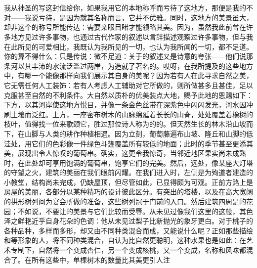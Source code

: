 

\section{}

\par

\par

我从神圣的写这封信给你，如果我用它的本地称呼而亏待了这地方，那便是我的不对——我说亏待，是因为就其名称而言，它并不优雅。同时，这地方的美景虽大，却非这个的称号所能传达：需要亲眼目睹才能领略其美。因为，虽然我此前曾在许多地方见过许多事物，也通过古代作家的叙述以言辞描述观察过许多事物，但与我在此所见的可爱相比，我既认为我所见的一切，也认为我所闻的一切，都不足道。你的算不得什么：只是传说：微不足道：关于的叙述又是诗意的夸张——他们说那条河以其丰沛的水流泛滥过两岸，为造就了著名的。哎呀，在我所提及的这些地方中，有哪一个能像那样向我们展示其自身的美呢？因为若有人在此寻求自然之美，它无需任何人工装饰：若有人考虑人工辅助对它所做的，则所做甚多且甚佳，足以克服甚至自然的不利条件。大自然以质朴的优美装点大地，赐予此地的恩赐如下：下方，以其河岸使这地方悦目，并像一条金色丝带在深紫色中闪闪发光，河水因冲刷土壤而泛红。上方，一座密布树木的山脉绵延着长长的山脊，处处覆盖着橡树的枝叶，值得找一位来歌颂它，胜过那位诗人称为的的。但天然生长的林木沿山坡而下，在山脚与人类的耕作种植相遇。因为立刻，葡萄藤遍布山坡、隆丘和山脚的低洼处，用它们的色彩像一件绿色斗篷覆盖所有较低的地面；此时的季节甚至更添其美，展现出令人惊叹的葡萄串。确实，这更令我惊奇，当邻近地区果实尚未成熟时，在此处却可享用饱满的葡萄串，饱享它们的完美。然后，远处，像某座大灯塔的守望之火，建筑的美丽在我们眼前闪耀。在我们进入时，左侧是为殉道者建造的小教堂，结构尚未完成，仍缺屋顶，但尽管如此，已显得颇为可观。正前方路上是房屋的美丽，各部分以某种精巧的设计彼此区分。有突出的塔楼，以及在高大宽阔的拱形树列间为宴会所做的准备，这些树列冠于门前的入口。然后建筑四周是的花园；不如说，不要让的美景与它们比较而受辱。从未见过像我们这里的这般，其色泽之鲜艳近乎自身花朵的色调：他从未见过梨子比新抛光的象牙更白。对于桃子的各种品种，多样而多形，却又由不同种类混合而成，又能说什么呢？正如那些描绘和等形象的人，将不同种类混合，自认为比自然更聪明，这种水果也是如此：在艺术专制下，自然将一个变成杏仁，另一个变成核桃，又一个变成，名称和风味都混合了。在所有这些中，单棵树木的数量比其美更引人注